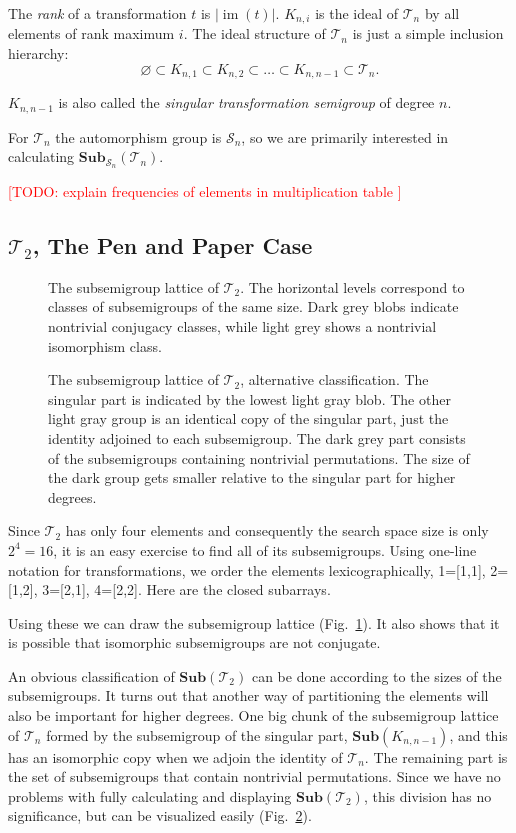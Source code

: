 \documentclass{amsart}
\newcommand{\cT}{{\mathcal T}}
\newcommand{\cS}{{\mathcal S}}
\newcommand{\Sub}{\mathbf{Sub}}
\DeclareMathOperator{\im}{im}
\newcommand{\todo}[1]{\textcolor{red}{ \small \textsf{[TODO:  #1 ]} \normalsize}}
\theoremstyle{plain}
\theoremstyle{definition}
\begin{document}
The \emph{rank} of a transformation $t$ is $|\im(t)|$. 
$K_{n,i}$ is the ideal of $\cT_n$ by all elements of rank maximum $i$.
The ideal structure of $\cT_n$ is just a simple inclusion hierarchy:
$$\varnothing\subset K_{n,1}\subset K_{n,2}\subset\ldots\subset K_{n,n-1}\subset \cT_n.$$

$K_{n,n-1}$ is also called the \emph{singular transformation semigroup} of degree $n$.

 For $\cT_n$ the automorphism group is $\cS_n$, so we are primarily interested in calculating $\Sub_{\cS_n}(\cT_n)$.

\todo{explain frequencies of elements in multiplication table}

\subsection{$\cT_2$, The Pen and Paper Case}
\begin{figure}[t]

\caption{The subsemigroup lattice of $\cT_2$. The horizontal levels correspond to classes of subsemigroups of the same size.  Dark grey blobs indicate nontrivial conjugacy classes, while light grey shows a nontrivial isomorphism class.}
\label{fig:T2subs}
\end{figure}
\begin{figure}

\caption{The subsemigroup lattice of $\cT_2$, alternative classification. The singular part is indicated by the lowest light gray blob. The other light gray group is an identical copy of the singular part, just the identity adjoined to each subsemigroup. The dark grey part consists of the subsemigroups containing nontrivial permutations. The size of the dark group gets smaller relative to the singular part for higher degrees.}
\label{fig:T2subsAlt}
\end{figure}
Since $\cT_2$ has only four elements and consequently the search space size is only $2^4=16$, it is an easy exercise to find all of its subsemigroups. 
Using one-line notation for transformations, we order the elements lexicographically, 1=[1,1], 2=[1,2], 3=[2,1], 4=[2,2]. Here are the closed subarrays.

Using these we can draw the subsemigroup lattice (Fig.\ \ref{fig:T2subs}).
It also shows that it is possible that isomorphic subsemigroups are not conjugate.

An obvious classification of $\Sub(\cT_2)$ can be done according to the sizes of the subsemigroups.
It turns out that another way of partitioning the elements will also be important for higher degrees. 
One big chunk of the subsemigroup lattice of $\cT_n$ formed by the subsemigroup of the singular part, $\Sub(K_{n,n-1})$, and this has an isomorphic copy when we adjoin the identity of $\cT_n$.
The remaining part is the set of subsemigroups that contain nontrivial permutations. 
Since we have no problems with fully calculating and displaying $\Sub(\cT_2)$, this division has no significance, but can be visualized easily (Fig.\ \ref{fig:T2subsAlt}).
\end{document}
